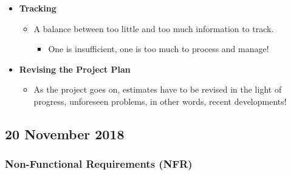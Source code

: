 \documentclass[a4paper]{article}
\providecommand{\tightlist}{%
  \setlength{\itemsep}{0pt}\setlength{\parskip}{0pt}}
\begin{document}
\begin{itemize}
\tightlist
\item
  \textbf{Tracking}

  \begin{itemize}
  \tightlist
  \item
    A balance between too little and too much information to track.

    \begin{itemize}
    \tightlist
    \item
      One is insufficient, one is too much to process and manage!
    \end{itemize}
  \end{itemize}
\item
  \textbf{Revising the Project Plan}

  \begin{itemize}
  \tightlist
  \item
    As the project goes on, estimates have to be revised in the light of
    progress, unforeseen problems, in other words, recent developments!
  \end{itemize}
\end{itemize}

\hypertarget{20-november-2018}{%
\subsection{20 November 2018}\label{20-november-2018}}

\hypertarget{non-functional-requirements-nfr}{%
\subsubsection{Non-Functional Requirements
(NFR)}\label{non-functional-requirements-nfr}}
\end{document}
